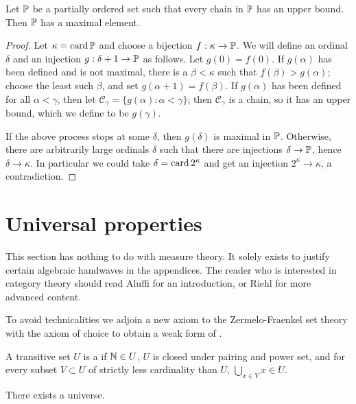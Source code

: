 \begin{theorem}
Let $\mathbb{P}$ be a partially ordered set such that every chain in $\mathbb{P}$ has an upper bound.
Then $\mathbb{P}$ has a maximal element.
\end{theorem}
\begin{proof}
Let $\kappa = \operatorname{card} \mathbb{P}$ and choose a bijection $f: \kappa \to \mathbb{P}$.
We will define an ordinal $\delta$ and an injection $g: \delta + 1 \to \mathbb{P}$ as follows.
Let $g(0) = f(0)$. If $g(\alpha)$ has been defined and is not maximal, there is a $\beta < \kappa$ such that $f(\beta) > g(\alpha)$; choose the least such $\beta$, and set $g(\alpha + 1) = f(\beta)$.
If $g(\alpha)$ has been defined for all $\alpha < \gamma$, then let $\mathcal C_\gamma = \{g(\alpha): \alpha < \gamma\}$; then $\mathcal C_\gamma$ is a chain, so it has an upper bound, which we define to be $g(\gamma)$.

If the above process stops at some $\delta$, then $g(\delta)$ is maximal in $\mathbb{P}$.
Otherwise, there are arbitrarily large ordinals $\delta$ such that there are injections $\delta \to \mathbb{P}$, hence $\delta \to \kappa$.
In particular we could take $\delta = \operatorname{card} 2^\kappa$ and get an injection $2^\kappa \to \kappa$, a contradiction.
\end{proof}

\section{Universal properties}
This section has nothing to do with measure theory.
It solely exists to justify certain algebraic handwaves in the appendices.
The reader who is interested in category theory should read Aluffi \cite{aluffi2009algebra} for an introduction, or Riehl \cite{riehl2017category} for more advanced content.

\begin{subsec}
To avoid technicalities we adjoin a new axiom to the Zermelo-Fraenkel set theory with the axiom of choice to obtain a weak form of .
\end{subsec}

\begin{definition}
A transitive set $U$ is a  if $\mathbb{N} \in U$, $U$ is closed under pairing and power set, and for every subset $V \subset U$ of strictly less cardinality than $U$, $\bigcup_{x \in V} x \in U$.
\end{definition}

\begin{axiom}[universe]
There exists a universe.
\end{axiom}

